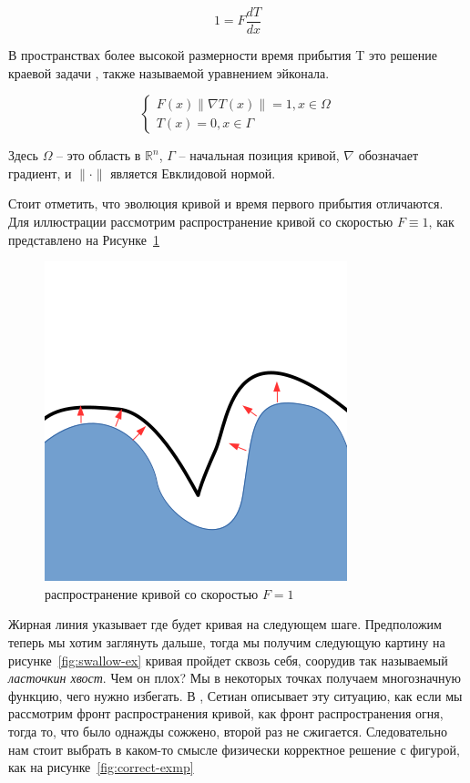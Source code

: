 \begin{equation*}
  1 = F \frac{dT}{dx}
\end{equation*}

В пространствах более высокой размерности время прибытия T это решение
краевой задачи , также называемой уравнением эйконала.

\begin{equation}
  \label{eq:eikonal}
  \left\{ \begin{matrix}
      F(x) \| \nabla T(x) \| = 1, x \in \Omega \\
      T(x) = 0, x \in \Gamma
    \end{matrix}\right.
\end{equation}

Здесь $\Omega$ -- это область в $\mathbb{R}^n$, $\Gamma$ -- начальная
позиция кривой, $\nabla$ обозначает градиент, и $\| \cdot \|$ является
Евклидовой нормой.

Стоит отметить, что эволюция кривой и время первого прибытия
отличаются. Для иллюстрации рассмотрим распространение кривой со
скоростью $F \equiv 1$, как представлено на Рисунке~\ref{fig:prpgt-eik}

\begin{figure}[h]
  \centering
  \includegraphics[width=0.3\linewidth]{img/propagate_eikonal.png}
  \hfil \caption{распространение кривой со скоростью $F = 1$}
  \label{fig:prpgt-eik}

\end{figure}

Жирная линия указывает где будет кривая на следующем шаге.  Предположим
теперь мы хотим заглянуть дальше, тогда мы получим следующую картину
на рисунке~\ref{fig:swallow-ex} кривая пройдет сквозь себя, соорудив
так называемый \textit{ласточкин хвост}. Чем он плох? Мы в некоторых
точках получаем многозначную функцию, чего нужно избегать. В
\cite{S1999}, Сетиан описывает эту ситуацию, как если мы рассмотрим
фронт распространения кривой, как фронт распространения огня, тогда
то, что было однажды сожжено, второй раз не сжигается.  Следовательно
нам стоит выбрать в каком-то смысле физически корректное решение с
фигурой, как на рисунке~\ref{fig:correct-exmp}


